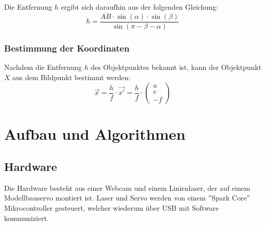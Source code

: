 \documentclass[ngerman,a4paper,parskip=half]{scrartcl}
\begin{document}
Die Entfernung $h$ ergibt sich daraufhin aus der folgenden Gleichung:
\[ h = \frac{\overline{AB} \cdot \sin(\alpha) \cdot \sin(\beta)}{\sin(\pi - \beta - \alpha)} \]

\subsubsection{Bestimmung der Koordinaten}

Nachdem die Entfernung $h$ des Objektpunktes bekannt ist, kann der Objektpunkt $X$ aus dem Bildpunkt bestimmt werden:
\[ \vec{x} = \frac{h}{f} \cdot \vec{x'} = \frac{h}{f} \cdot \begin{pmatrix}
u \\ v \\ -f
\end{pmatrix} \]


\section{Aufbau und Algorithmen}
\label{sec:realization}

\subsection{Hardware}

Die Hardware besteht aus einer Webcam und einem Linienlaser, der auf einem Modellbauservo montiert ist. Laser und Servo werden von einem ''Spark Core'' Mikrocontroller gesteuert, welcher wiederum über USB mit Software kommuniziert.
\end{document}

